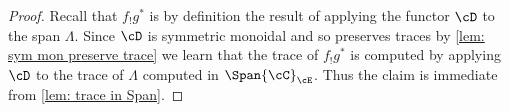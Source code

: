 \begin{proof}
  Recall that $f_!g^*$ is by definition the result of applying 
  the functor $\cD$ to the span $\Lambda$. 
  Since $\cD$ is symmetric monoidal and so
  preserves traces by \cref{lem: sym mon preserve trace}
  we learn that the trace of $f_!g^*$ is computed by applying $\cD$ to the trace
  of $\Lambda$ computed in $\Span{\cC}_{\cE}$. Thus the claim is immediate
  from \cref{lem: trace in Span}. 

  


\end{proof}

